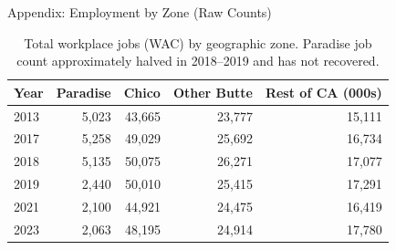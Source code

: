 \documentclass[aspectratio=169, 12pt]{beamer}
\begin{document}
\begin{frame}{Appendix: Employment by Zone (Raw Counts)}
  \begin{table}
    \centering
    \footnotesize
    \begin{tabular}{lrrrr}
      \toprule
      \textbf{Year} & \textbf{Paradise} & \textbf{Chico} & \textbf{Other Butte} & \textbf{Rest of CA (000s)} \\
      \midrule
      2013 &  5,023 & 43,665 & 23,777 & 15,111 \\
      2017 &  5,258 & 49,029 & 25,692 & 16,734 \\
      2018 &  5,135 & 50,075 & 26,271 & 17,077 \\
      2019 &  2,440 & 50,010 & 25,415 & 17,291 \\
      2021 &  2,100 & 44,921 & 24,475 & 16,419 \\
      2023 &  2,063 & 48,195 & 24,914 & 17,780 \\
      \bottomrule
    \end{tabular}
    \caption{Total workplace jobs (WAC) by geographic zone.
    Paradise job count approximately halved in 2018--2019 and has not recovered.}
  \end{table}
\end{frame}
\end{document}
